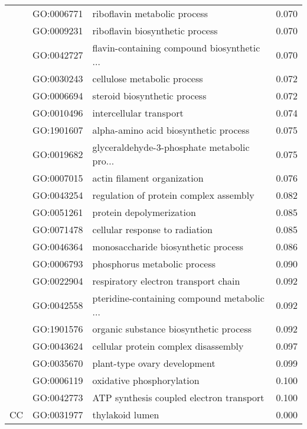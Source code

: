 \begin{longtable}{lllr}
   & GO:0006771 &                 riboflavin metabolic process &         0.070 \\
   & GO:0009231 &              riboflavin biosynthetic process &         0.070 \\
   & GO:0042727 &  flavin-containing compound biosynthetic ... &         0.070 \\
   & GO:0030243 &                  cellulose metabolic process &         0.072 \\
   & GO:0006694 &                 steroid biosynthetic process &         0.072 \\
   & GO:0010496 &                      intercellular transport &         0.074 \\
   & GO:1901607 &        alpha-amino acid biosynthetic process &         0.075 \\
   & GO:0019682 &  glyceraldehyde-3-phosphate metabolic pro... &         0.075 \\
   & GO:0007015 &                  actin filament organization &         0.076 \\
   & GO:0043254 &       regulation of protein complex assembly &         0.082 \\
   & GO:0051261 &                     protein depolymerization &         0.085 \\
   & GO:0071478 &               cellular response to radiation &         0.085 \\
   & GO:0046364 &          monosaccharide biosynthetic process &         0.086 \\
   & GO:0006793 &                 phosphorus metabolic process &         0.090 \\
   & GO:0022904 &         respiratory electron transport chain &         0.092 \\
   & GO:0042558 &  pteridine-containing compound metabolic ... &         0.092 \\
   & GO:1901576 &       organic substance biosynthetic process &         0.092 \\
   & GO:0043624 &         cellular protein complex disassembly &         0.097 \\
   & GO:0035670 &                 plant-type ovary development &         0.099 \\
   & GO:0006119 &                    oxidative phosphorylation &         0.100 \\
   & GO:0042773 &     ATP synthesis coupled electron transport &         0.100 \\
\cline{1-4}
\multirow{42}{*}{CC} & GO:0031977 &                              thylakoid lumen &         0.000 \\

\end{longtable}
